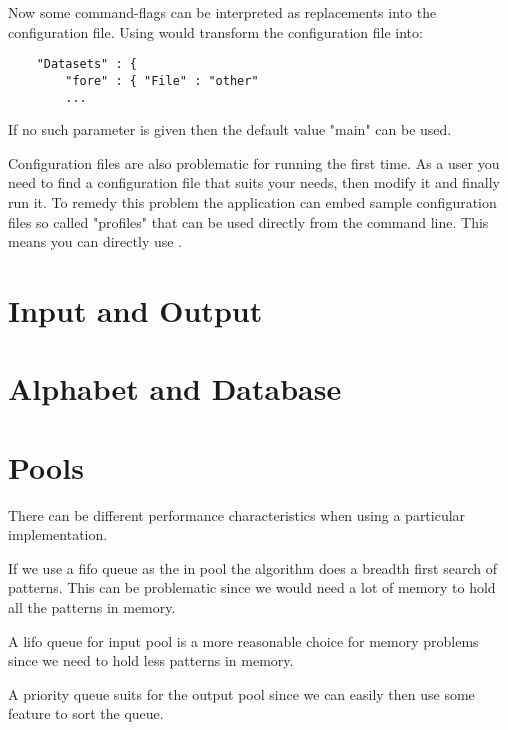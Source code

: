 Now some command-flags can be interpreted as replacements into the configuration file. Using  would transform the configuration file into:

\begin{lstlisting}
    "Datasets" : {
        "fore" : { "File" : "other"
        ...
\end{lstlisting}

If no such parameter is given then the default value "main" can be used.

Configuration files are also problematic for running the first time. As a user you need to find a configuration file that suits your needs, then modify it and finally run it. To remedy this problem the application can embed sample configuration files so called "profiles" that can be used directly from the command line. This means you can directly use .

\section{Input and Output}

\WIP


\section{Alphabet and Database}

\WIP


\section{Pools}

\WIP

There can be different performance characteristics when using a particular implementation.

If we use a fifo queue as the in pool the algorithm does a breadth first search of patterns. This can be problematic since we would need a lot of memory to hold all the patterns in memory.

A lifo queue for input pool is a more reasonable choice for memory problems since we need to hold less patterns in memory.

A priority queue suits for the output pool since we can easily then use some feature to sort the queue.

